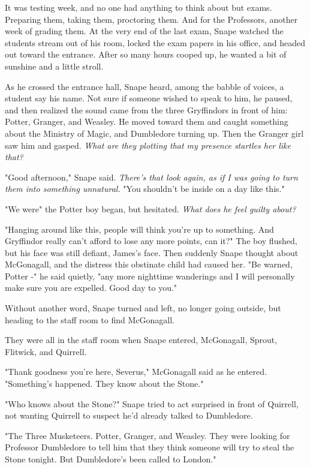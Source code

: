 \sbreak

It was testing week, and no one had anything to think about but exams. Preparing them, taking them, proctoring them. And for the Professors, another week of grading them. At the very end of the last exam, Snape watched the students stream out of his room, locked the exam papers in his office, and headed out toward the entrance. After so many hours cooped up, he wanted a bit of sunshine and a little stroll.

As he crossed the entrance hall, Snape heard, among the babble of voices, a student say his name. Not sure if someone wished to speak to him, he paused, and then realized the sound came from the three Gryffindors in front of him: Potter, Granger, and Weasley. He moved toward them and caught something about the Ministry of Magic, and Dumbledore turning up. Then the Granger girl saw him and gasped. \emph{What are they plotting that my presence startles her like that?}

"Good afternoon," Snape said. \emph{There's that look again, as if I was going to turn them into{\el} something unnatural.} "You shouldn't be inside on a day like this."

"We were{\el}" the Potter boy began, but hesitated. \emph{What does he feel guilty about?}

"Hanging around like this, people will think you're up to something. And Gryffindor really can't afford to lose any more points, can it?" The boy flushed, but his face was still defiant, James's face. Then suddenly Snape thought about McGonagall, and the distress this obstinate child had caused her. "Be warned, Potter -" he said quietly, "any more nighttime wanderings and I will personally make sure you are expelled. Good day to you."

Without another word, Snape turned and left, no longer going outside, but heading to the staff room to find McGonagall.

They were all in the staff room when Snape entered, McGonagall, Sprout, Flitwick, and Quirrell.

"Thank goodness you're here, Severus," McGonagall said as he entered. "Something's happened. They know about the Stone."

"Who knows about the Stone?" Snape tried to act surprised in front of Quirrell, not wanting Quirrell to suspect he'd already talked to Dumbledore.

"The Three Musketeers. Potter, Granger, and Weasley. They were looking for Professor Dumbledore to tell him that they think someone will try to steal the Stone tonight. But Dumbledore's been called to London."

